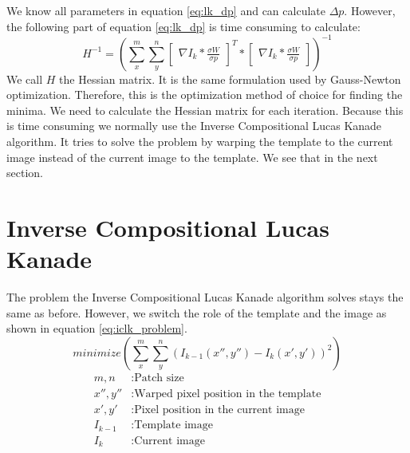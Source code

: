 \documentclass[11pt,a4paper,titlepage,oneside]{report}
\begin{document}
We know all parameters in equation \ref{eq:lk_dp} and can calculate $\Delta p$. However, the following part of equation \ref{eq:lk_dp} is time consuming to calculate:
\begin{equation}
	H^{-1}=(\sum_x^m\sum_y^n\begin{bmatrix}\nabla I_{k}*\frac{\sigma W}{\sigma p}\end{bmatrix}^T*\begin{bmatrix}\nabla I_{k}*\frac{\sigma W}{\sigma p}\end{bmatrix})^{-1}
\end{equation}
We call $H$ the Hessian matrix. It is the same formulation used by Gauss-Newton optimization. Therefore, this is the optimization method of choice for finding the minima. We need to calculate the Hessian matrix for each iteration. Because this is time consuming we normally use the Inverse Compositional Lucas Kanade algorithm. It tries to solve the problem by warping the template to the current image instead of the current image to the template. We see that in the next section.

\section{Inverse Compositional Lucas Kanade}
The problem the Inverse Compositional Lucas Kanade algorithm solves stays the same as before. However, we switch the role of the template and the image as shown in equation \ref{eq:iclk_problem}.
\begin{equation}\label{eq:iclk_problem}
	minimize(\sum_x^m\sum_y^n(I_{k-1}(x'',y'')-I_{k}(x',y'))^2)
\end{equation}
\begin{align*}
	m,n				 &: \text{Patch size}\\
  x'',y''    &: \text{Warped pixel position in the template}\\
  x',y'      &: \text{Pixel position in the current image}\\
  I_{k-1}    &: \text{Template image}\\
  I_{k}      &: \text{Current image}
\end{align*}
\end{document}
